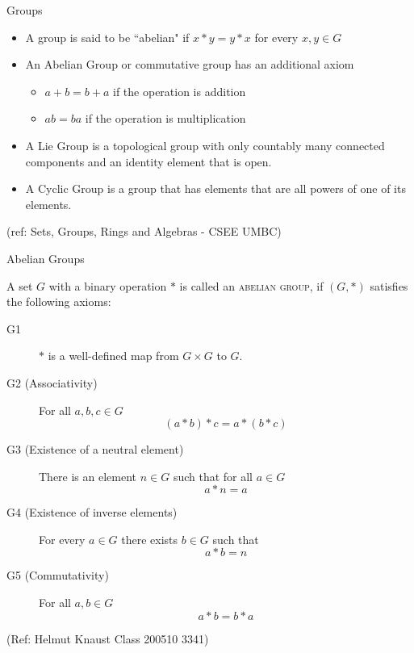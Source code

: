 \begin{frame}{Groups}

\begin{itemize}
\item A group is said to be ``abelian" if $x \ast y = y \ast x$ for every $x,y \in G$ 
\item An Abelian Group or commutative group has an additional axiom
\begin{itemize}
\item $a+b = b+a$  if the operation is addition
\item $ab = ba$  if the operation is multiplication
\end{itemize}
\item A Lie Group is a topological group with only countably many connected
  components and an identity element that is open.
	\item A Cyclic Group is a group that has elements that are all powers of one
  of its elements.
\end{itemize}


\tiny{(ref: Sets, Groups, Rings and Algebras - CSEE UMBC)}

\end{frame}


\begin{frame}{Abelian Groups}

A set $G$ with a binary operation $*$ is called an
\textsc{abelian group}, if $(G,*)$ satisfies the following axioms:

\begin{description}
\item[G1] $*$ is a well-defined map from $G\times G$ to
$G$.
\item[G2 (Associativity)] For all $a,b,c\in G$
\[(a*b)*c=a*(b*c)\]
\item[G3 (Existence of a neutral element)] There is an element
$n\in G$ such that for all $a\in G$
\[a*n=a\]
\item[G4 (Existence of inverse elements)] For every $a\in G$ there exists $b\in
G$ such that
\[a*b=n\]
\item[G5 (Commutativity)] For all $a,b\in G$
\[a*b=b*a\]
\end{description}


\tiny{(Ref: Helmut Knaust Class 200510 3341)}

\end{frame}

